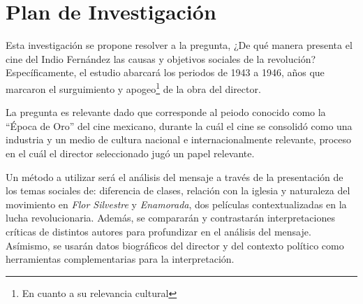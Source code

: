 \section{Plan de Investigación}
Esta investigación se propone resolver a la pregunta,
¿De qué manera presenta el cine del Indio Fernández las causas y objetivos sociales de la revolución? Específicamente, el estudio abarcará los periodos de 1943 a 1946, años que marcaron el surguimiento y apogeo\footnote{En cuanto a su relevancia cultural} de la obra del director\autocite[133]{mora_mexican_1978-2}.

La pregunta es relevante dado que corresponde al peiodo conocido como la ``Época de Oro'' del cine mexicano, durante la cuál el cine se consolidó como una industria y un medio de cultura nacional e internacionalmente relevante, proceso en el cuál el director seleccionado jugó un papel relevante\autocite[133]{mora_mexican_1978-2}.

Un método a utilizar será el análisis del mensaje a través de la presentación de los temas sociales de: diferencia de clases, relación con la iglesia y naturaleza del movimiento en \emph{Flor Silvestre} y  \emph{Enamorada}, dos películas contextualizadas en la lucha revolucionaria. Además, se compararán y contrastarán interpretaciones críticas de distintos autores para profundizar en el análisis del mensaje.  Asímismo, se usarán datos biográficos del director y del contexto político como herramientas complementarias para la interpretación. 

\pagebreak
